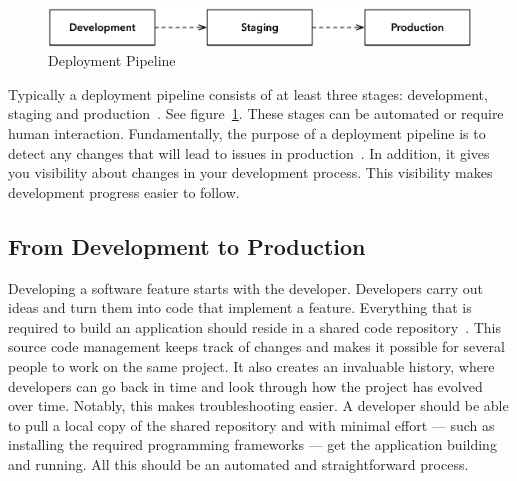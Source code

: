 \documentclass[english]{tktltiki2}
\begin{document}
\begin{figure}[h!]

    \centering
    \vspace{1cm}

    \includegraphics[scale = 0.6]{figures/deployment-pipeline}

    \caption{Deployment Pipeline}
    \label{figure:deployment-pipeline}

    \vspace{1cm}

\end{figure}

Typically a deployment pipeline consists of at least three stages: development, staging and production~\cite{HF11}. See figure~\ref{figure:deployment-pipeline}. These stages can be automated or require human interaction. Fundamentally, the purpose of a deployment pipeline is to detect any changes that will lead to issues in production~\cite{Fow13b}. In addition, it gives you visibility about changes in your development process. This visibility makes development progress easier to follow.

\subsection{From Development to Production}

Developing a software feature starts with the developer. Developers carry out ideas and turn them into code that implement a feature. Everything that is required to build an application should reside in a shared code repository~\cite{HF11}. This source code management keeps track of changes and makes it possible for several people to work on the same project. It also creates an invaluable history, where developers can go back in time and look through how the project has evolved over time. Notably, this makes troubleshooting easier. A developer should be able to pull a local copy of the shared repository and with minimal effort — such as installing the required programming frameworks — get the application building and running. All this should be an automated and straightforward process.
\end{document}
